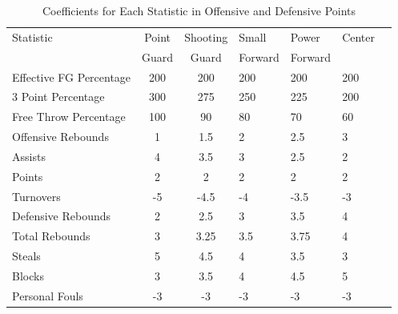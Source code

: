 \documentclass[12pt]{article}
\begin{document}
\begin{table}[tbp]
  \caption{Coefficients for Each Statistic in Offensive and Defensive Points}
  \label{tab:Coefficientstable}
\centering
\begin{tabular}[t]{lccllll}
  \toprule
  Statistic & Point & Shooting & Small & Power  & Center\\
  & Guard & Guard & Forward & Forward & \\
  \midrule
 Effective FG Percentage & 200 & 200 & 200 & 200 & 200\\
 3 Point Percentage & 300 & 275 & 250 & 225 & 200\\
 Free Throw Percentage & 100 & 90 & 80 & 70 & 60\\
 Offensive Rebounds & 1 & 1.5 & 2 & 2.5 & 3\\
 Assists & 4 & 3.5 & 3 & 2.5 & 2\\
 Points & 2 & 2 & 2 & 2 & 2\\
 Turnovers & -5 & -4.5 & -4 & -3.5 & -3\\
 Defensive Rebounds & 2 & 2.5 & 3 & 3.5 & 4\\
 Total Rebounds & 3 & 3.25 & 3.5 & 3.75 & 4\\
 Steals & 5 & 4.5 & 4 & 3.5 & 3\\
 Blocks & 3 & 3.5 & 4 & 4.5 & 5\\
 Personal Fouls & -3 & -3 & -3 & -3 & -3\\
  \bottomrule
\end{tabular}
\end{table}
\end{document}
